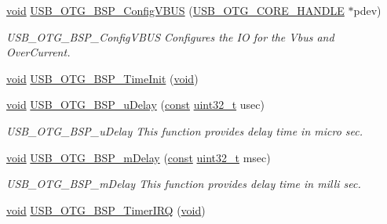\begin{DoxyCompactItemize}
\hyperlink{group___n_a_m_e_ga18028b8badbf1ea7e704ccac3c488e82}{void} \hyperlink{group___p_i_o_s___u_s_b_ga02dee21bb9a092415782c0e1a460981c}{U\-S\-B\-\_\-\-O\-T\-G\-\_\-\-B\-S\-P\-\_\-\-Config\-V\-B\-U\-S} (\hyperlink{group___u_s_b___c_o_r_e___exported___types_gaf76054c11eb8a3367907aad7ae700e80}{U\-S\-B\-\_\-\-O\-T\-G\-\_\-\-C\-O\-R\-E\-\_\-\-H\-A\-N\-D\-L\-E} $\ast$pdev)
\begin{DoxyCompactList}\small\item\em U\-S\-B\-\_\-\-O\-T\-G\-\_\-\-B\-S\-P\-\_\-\-Config\-V\-B\-U\-S Configures the I\-O for the Vbus and Over\-Current. \end{DoxyCompactList}\item 
\hyperlink{group___n_a_m_e_ga18028b8badbf1ea7e704ccac3c488e82}{void} \hyperlink{group___p_i_o_s___u_s_b_ga880a11758cfe2348112a30a0ea44c32f}{U\-S\-B\-\_\-\-O\-T\-G\-\_\-\-B\-S\-P\-\_\-\-Time\-Init} (\hyperlink{group___n_a_m_e_ga18028b8badbf1ea7e704ccac3c488e82}{void})
\item 
\hyperlink{group___n_a_m_e_ga18028b8badbf1ea7e704ccac3c488e82}{void} \hyperlink{group___p_i_o_s___u_s_b_gaa70213d9a7b9b047dc6d3357f99e19b5}{U\-S\-B\-\_\-\-O\-T\-G\-\_\-\-B\-S\-P\-\_\-u\-Delay} (\hyperlink{group___n_a_m_e_ga7ae6d0e43244213b34de2c2b9aa30da6}{const} \hyperlink{stdint_8h_a435d1572bf3f880d55459d9805097f62}{uint32\-\_\-t} usec)
\begin{DoxyCompactList}\small\item\em U\-S\-B\-\_\-\-O\-T\-G\-\_\-\-B\-S\-P\-\_\-u\-Delay This function provides delay time in micro sec. \end{DoxyCompactList}\item 
\hyperlink{group___n_a_m_e_ga18028b8badbf1ea7e704ccac3c488e82}{void} \hyperlink{group___p_i_o_s___u_s_b_ga28c906bec05a1b7f91aa0e4ff5d8a16c}{U\-S\-B\-\_\-\-O\-T\-G\-\_\-\-B\-S\-P\-\_\-m\-Delay} (\hyperlink{group___n_a_m_e_ga7ae6d0e43244213b34de2c2b9aa30da6}{const} \hyperlink{stdint_8h_a435d1572bf3f880d55459d9805097f62}{uint32\-\_\-t} msec)
\begin{DoxyCompactList}\small\item\em U\-S\-B\-\_\-\-O\-T\-G\-\_\-\-B\-S\-P\-\_\-m\-Delay This function provides delay time in milli sec. \end{DoxyCompactList}\item 
\hyperlink{group___n_a_m_e_ga18028b8badbf1ea7e704ccac3c488e82}{void} \hyperlink{group___p_i_o_s___u_s_b_ga97a8f22d2dce112b90488d9afd3fbbdb}{U\-S\-B\-\_\-\-O\-T\-G\-\_\-\-B\-S\-P\-\_\-\-Timer\-I\-R\-Q} (\hyperlink{group___n_a_m_e_ga18028b8badbf1ea7e704ccac3c488e82}{void})
\end{DoxyCompactItemize}
